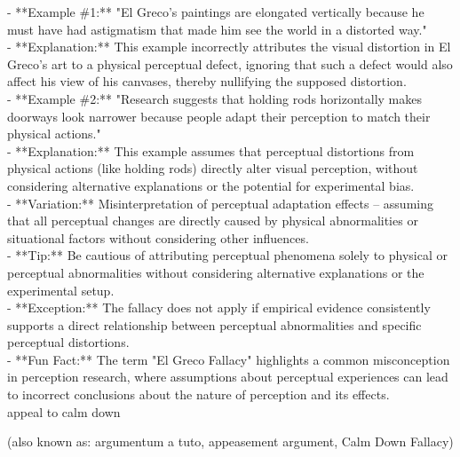 \documentclass[a4paper,12pt,single,pdftex]{scrartcl}
\begin{document}
    
      - **Example \#1:** "El Greco's paintings are elongated vertically because he must have had astigmatism that made him see the world in a distorted way."
    \\

    
      - **Explanation:** This example incorrectly attributes the visual distortion in El Greco's art to a physical perceptual defect, ignoring that such a defect would also affect his view of his canvases, thereby nullifying the supposed distortion.
    \\

    
      - **Example \#2:** "Research suggests that holding rods horizontally makes doorways look narrower because people adapt their perception to match their physical actions."
    \\

    
      - **Explanation:** This example assumes that perceptual distortions from physical actions (like holding rods) directly alter visual perception, without considering alternative explanations or the potential for experimental bias.
    \\

    
      - **Variation:** Misinterpretation of perceptual adaptation effects – assuming that all perceptual changes are directly caused by physical abnormalities or situational factors without considering other influences.
    \\

    
      - **Tip:** Be cautious of attributing perceptual phenomena solely to physical or perceptual abnormalities without considering alternative explanations or the experimental setup.
    \\

    
      - **Exception:** The fallacy does not apply if empirical evidence consistently supports a direct relationship between perceptual abnormalities and specific perceptual distortions.
    \\

    
      - **Fun Fact:** The term "El Greco Fallacy" highlights a common misconception in perception research, where assumptions about perceptual experiences can lead to incorrect conclusions about the nature of perception and its effects.
    \\

  

appeal to calm down
    
      (also known as: argumentum a tuto, appeasement argument, Calm Down Fallacy)
    \\
\end{document}
